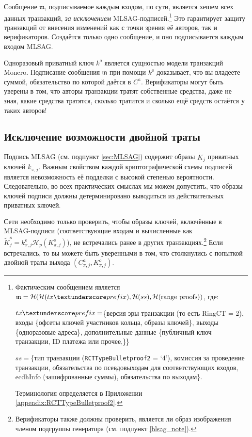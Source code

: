 Сообщение $\mathfrak{m}$, подписываемое каждым входом, по сути, является хешем всех данных транзак\-ций, {\em за исключением} MLSAG-подписей.\footnote{Фактическим сообщением является $\mathfrak{m} = \mathcal{H}(\mathcal{H}(tx\textunderscore prefix),\mathcal{H}(ss),\mathcal{H}(\text{range proofs}))$, где:\par
$tx\textunderscore prefix = $\{версия эры транзакции (то есть RingCT = 2), входы \{офсеты ключей участников кольца, образы ключей\}, выходы \{одноразовые адреса\}, дополнительные данные \{публичный ключ транзакции, ID платежа или прочее,\}\}\par
$ss = $\{тип транзакции ({\tt RCTTypeBulletproof2} = `4'), комиссия за проведение транзакции, обязательства по псевдовыходам для соответствующих входов, ecdhInfo (зашифрованные суммы), обязательства по выходам\}.\par
Терминология определяется в Приложении \ref{appendix:RCTTypeBulletproof2}.} Это гарантирует защиту транзакций от внесения изменений как с точки зрения её авторов, так и верификаторов. Создаётся только одно сообщение, и оно подписывается каждым входом MLSAG.

Одноразовый приватный ключ $k^o$ является сущностью модели транзакций Monero. Подписа\-ние сообщения $\mathfrak{m}$ при помощи $k^o$ доказывает, что вы владеете суммой, обязательство по которой даётся в $C^a$. Верификаторы могут быть уверены в том, что авторы транзакции тратят собственные средства, даже не зная, какие средства тратятся, сколько тратится и сколько ещё средств остаётся у таких авторов!


\subsection{Исключение возможности двойной траты}

Подпись MLSAG (см. подпункт \ref{sec:MLSAG}) содержит образы \(\tilde{K}_{j}\) приватных ключей \(k_{\pi, j}\). Важным свойством каждой криптографической схемы подписей является невозможность её подделки с высокой степенью вероятности. Следовательно, во всех практических смыслах мы можем допустить, что образы ключей подписи должны детерминировано выводиться из действи\-тельных приватных ключей.

Сети необходимо только проверить, чтобы образы ключей, включённые в MLSAG-подписи (соответствующие входам и вычисленные как $\tilde{K}^o_{j} = k^o_{\pi,j} \mathcal{H}_p(K^o_{\pi,j})$), не встречались ранее в других транзакциях.\footnote{Верификаторы также должны проверить, является ли образ изображения членом подгруппы генератора (см. подпункт \ref{blsag_note}).} Если встречались, то вы можете быть уверенными в том, что столкнулись с попыткой двойной траты выхода $(C^a_{\pi,j}, K_{\pi,j}^o)$.


